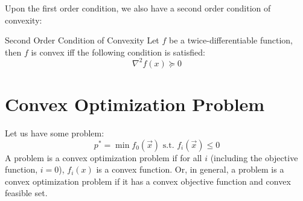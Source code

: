 Upon the first order condition, we also have a second order condition of convexity:
\begin{ln-define}{Second Order Condition of Convexity}{}
    Let $f$ be a twice-differentiable function, then $f$ is convex iff the following condition is satisfied:
    \[
        \nabla^2 f(x) \succcurlyeq 0
    \]
\end{ln-define}

\section{Convex Optimization Problem}
Let us have some problem:
\[
    p^* = \min f_0(\vec{x}) \text{ s.t. } f_i(\vec{x}) \leq 0
\]
A problem is a convex optimization problem if for all $i$ (including the objective function, $i = 0$), $f_i(x)$ is a convex function.
Or, in general, a problem is a convex optimization problem if it has a convex objective function and convex feasible set.
